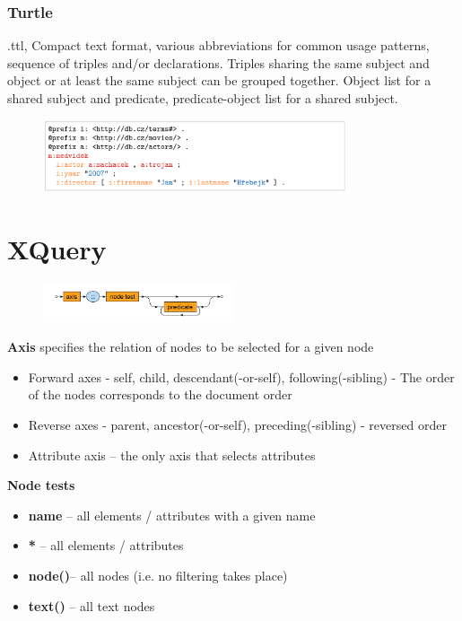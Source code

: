 \pagebreak
\subsubsection{Turtle}
.ttl, Compact text format, various abbreviations for common usage patterns, sequence of triples and/or declarations. Triples sharing the same subject and object or at least the same subject can be grouped together. Object list for a shared subject and predicate, predicate-object list for a shared subject.

\begin{figure}[ht!]
\centering
\includegraphics[width=0.8\textwidth]{oborove/DS2/img/turtl.png}
\end{figure}

\section{XQuery}
\begin{figure}[ht!]
\centering
\includegraphics[width=0.5\textwidth]{oborove/DS2/img/xquery.png}
\end{figure}

\textbf{Axis} specifies the relation of nodes to be selected for a given node
\begin{itemize}
    \item Forward axes - self, child, descendant(-or-self), following(-sibling) - The order of the nodes corresponds to the document order
    \item Reverse axes - parent, ancestor(-or-self), preceding(-sibling) - reversed order
    \item Attribute axis – the only axis that selects attributes
\end{itemize}
\textbf{Node tests}
\begin{itemize}
    \item \textbf{name} – all elements / attributes with a given name
    \item \textbf{*} – all elements / attributes
    \item \textbf{node()}– all nodes (i.e. no filtering takes place)
    \item \textbf{text()} – all text nodes
\end{itemize}

